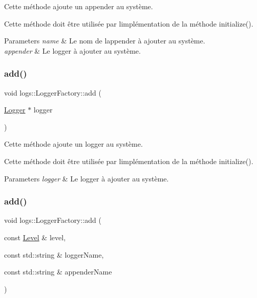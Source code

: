 Cette méthode ajoute un appender au système. 

Cette méthode doit être utilisée par l\textquotesingle{}implémentation de la méthode {\ttfamily initialize()}.


\begin{DoxyParams}{Parameters}
{\em name} & Le nom de l\textquotesingle{}appender à ajouter au système. \\
\hline
{\em appender} & Le logger à ajouter au système. \\
\hline
\end{DoxyParams}
\mbox{\label{classlogs_1_1LoggerFactory_a4a5dc780d448355be6eb117ed9a42a8b}} 
\subsubsection{\texorpdfstring{add()}{add()}\hspace{0.1cm}{\footnotesize\ttfamily [2/3]}}
{\footnotesize\ttfamily void logs\+::\+Logger\+Factory\+::add (\begin{DoxyParamCaption}\item[{\hyperlink{classlogs_1_1Logger}{Logger} $\ast$}]{logger }\end{DoxyParamCaption})\hspace{0.3cm}{\ttfamily [protected]}}



Cette méthode ajoute un logger au système. 

Cette méthode doit être utilisée par l\textquotesingle{}implémentation de la méthode {\ttfamily initialize()}.


\begin{DoxyParams}{Parameters}
{\em logger} & Le logger à ajouter au système. \\
\hline
\end{DoxyParams}
\mbox{\label{classlogs_1_1LoggerFactory_a030b1b4309b60b662340faa0dad2ca1e}} 
\subsubsection{\texorpdfstring{add()}{add()}\hspace{0.1cm}{\footnotesize\ttfamily [3/3]}}
{\footnotesize\ttfamily void logs\+::\+Logger\+Factory\+::add (\begin{DoxyParamCaption}\item[{const \hyperlink{classlogs_1_1Level}{Level} \&}]{level,  }\item[{const std\+::string \&}]{logger\+Name,  }\item[{const std\+::string \&}]{appender\+Name }\end{DoxyParamCaption})\hspace{0.3cm}{\ttfamily [protected]}}



